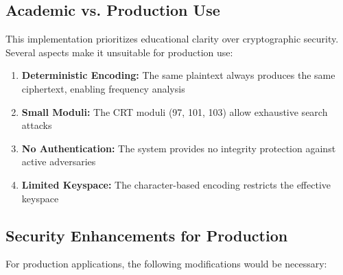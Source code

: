 \documentclass[12pt,a4paper]{article}
\begin{document}
\subsection{Academic vs. Production Use}

This implementation prioritizes educational clarity over cryptographic security. Several aspects make it unsuitable for production use:

\begin{enumerate}
    \item \textbf{Deterministic Encoding:} The same plaintext always produces the same ciphertext, enabling frequency analysis
    \item \textbf{Small Moduli:} The CRT moduli (97, 101, 103) allow exhaustive search attacks
    \item \textbf{No Authentication:} The system provides no integrity protection against active adversaries
    \item \textbf{Limited Keyspace:} The character-based encoding restricts the effective keyspace
\end{enumerate}

\subsection{Security Enhancements for Production}

For production applications, the following modifications would be necessary:
\end{document}
